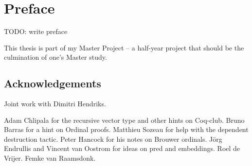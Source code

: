 \chapter*{Preface}
\thispagestyle{empty}

TODO: write preface

This thesis is part of my Master Project -- a half-year project that should be
the culmination of one's Master study.


\section*{Acknowledgements}

Joint work with Dimitri Hendriks.

Adam Chlipala for the recursive vector type and other hints on
Coq-club. Bruno Barras for a hint on Ordinal proofs. Matthieu Sozeau for help
with the dependent destruction tactic. Peter Hancock for his notes on Brouwer
ordinals. J\"org Endrullis and Vincent van Oostrom for ideas on pred and
embeddings. Roel de Vrijer. Femke van Raamsdonk.
